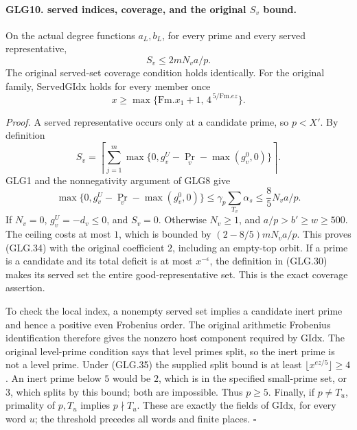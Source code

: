 \documentclass[11pt,a4paper]{article}
\numberwithin{equation}{section}
\theoremstyle{remark}\newtheorem{remark}[theorem]{Remark}
\begin{document}
\paragraph{GLG10. served indices, coverage, and the original \(S_v\) bound.}
\label{claim:GLG10}
On the actual degree functions \(a_L,b_L\), for every prime
and every served representative,
\[
                         S_v\le 2mN_va/p .                        \tag{GLG.34}
\]
The original served-set coverage condition holds identically.
For the original family, \(\mathrm{ServedGIdx}\) holds for every
member once
\[
              x\ge\max\{\mathrm{Fm}.x_1+1,\,
                                      4^{\,5/\mathrm{Fm}.ez}\}.   \tag{GLG.35}
\]

\emph{Proof.}
A served representative occurs only at a candidate prime, so
\(p<X'\). By definition
\[
 S_v=\left\lceil\sum_{j=1}^m
       \max\{0,g_v^U-\Pr_v-\max(g_v^0,0)\}\right\rceil .
 \]
GLG1 and the nonnegativity argument of GLG8 give
\[
 \max\{0,g_v^U-\Pr_v-\max(g_v^0,0)\}
       \le\gamma_p\sum_{T_v}\alpha_s\le\frac85N_va/p.
 \]
If \(N_v=0\), \(g_v^U=-d_v\le0\), and \(S_v=0\).
Otherwise \(N_v\ge1\), and \(a/p>b'\ge w\ge500\).
The ceiling costs at most \(1\), which is bounded by
\((2-8/5)mN_va/p\). This proves (GLG.34) with the
original coefficient \(2\), including an empty-top orbit.
If a prime is a candidate and its total deficit is at most
\(x^{-\epsilon}\), the definition in (GLG.30) makes its
served set the entire good-representative set. This is the
exact coverage assertion.

To check the local index, a nonempty served set implies a
candidate inert prime and hence a positive even Frobenius
order. The original arithmetic Frobenius identification
therefore gives the nonzero host component required by
\(\mathrm{GIdx}\). The original level-prime condition says
that level primes split, so the inert prime is not a level
prime. Under (GLG.35) the supplied split bound is at least
\(\lfloor x^{ez/5}\rfloor\ge4\). An inert prime below \(5\)
would be \(2\), which is in the specified small-prime set,
or \(3\), which splits by this bound; both are impossible.
Thus \(p\ge5\). Finally, if \(p\ne T_u\), primality of
\(p,T_u\) implies \(p\nmid T_u\). These are exactly the
fields of \(\mathrm{GIdx}\), for every word \(u\); the
threshold precedes all words and finite places.
\hfill\(\square\)

\end{document}
